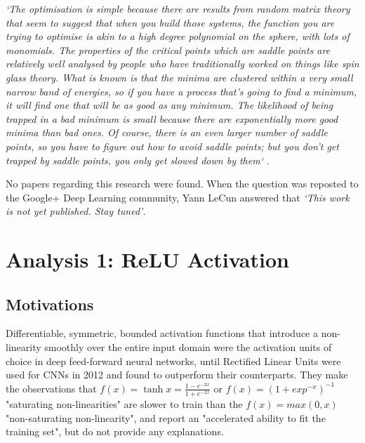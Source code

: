 \documentclass[a4paper,11pt]{article}
\begin{document}
\textit{`The optimisation is simple because there are results from random matrix theory that seem to suggest that when you build those systems, the function you are trying to optimise is akin to a high degree polynomial on the sphere, with lots of monomials. The properties of the critical points which are saddle points are relatively well analysed by people who have traditionally worked on things like spin glass theory. What is known is that the minima are clustered within a very small narrow band of energies, so if you have a process that's going to find a minimum, it will find one that will be as good as any minimum. The likelihood of being trapped in a bad minimum is small because there are exponentially more good minima than bad ones. Of course, there is an even larger number of saddle points, so you have to figure out how to avoid saddle points; but you don't get trapped by saddle points, you only get slowed down by them`} \cite{labex-bezout}.

No papers regarding this research were found. When the question was reposted to the Google+ Deep Learning community, Yann LeCun answered that \textit{`This work is not yet published. Stay tuned'}.

\clearpage

\section{Analysis 1: ReLU Activation}

\subsection{Motivations}

Differentiable, symmetric, bounded activation functions that introduce a non-linearity smoothly over the entire input domain were the activation units of choice in deep feed-forward neural networks, until Rectified Linear Units were used for CNNs in 2012 \cite{krizhevsky} and found to outperform their counterparts. They make the observations that $f(x) = \tanh x = \frac{1 - e^{-2x}}{1 + e^{-2x}}$ or $f(x) = (1+ exp^{-x})^{-1}$ "saturating non-linearities" are slower to train than the $f(x) = max(0,x)$ "non-saturating non-linearity", and report an "accelerated ability to fit the training set", but do not provide any explanations.   \\
\end{document}
